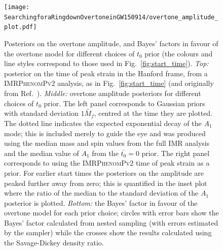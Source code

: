 \begin{figure}[t!]
    \centering
    \texttt{[image: SearchingforaRingdownOvertoneinGW150914/overtone\_amplitude\_plot.pdf]}
    \caption[Posteriors on the GW150914 overtone amplitude and Bayes' factors in favour of the overtone model for each choice of ringdown start-time prior]{ 
    Posteriors on the overtone amplitude, and Bayes' factors in favour of the overtone model for different choices of $t_0$ prior (the colours and line styles correspond to those used in Fig.~\ref{fig:start_time}).
    \emph{Top:} posterior on the time of peak strain in the Hanford frame, from a \textsc{IMRPhenomPv2} analysis, as in Fig.~\ref{fig:start_time} (and originally from Ref.~\cite{Isi:2022mhy}). 
    \emph{Middle:} overtone amplitude posteriors for different choices of $t_0$ prior. The left panel corresponds to Gaussian priors with standard deviation $1\tilde{M_f}$, centred at the time they are plotted.
    The dotted line indicates the expected exponential decay of the $A_1$ mode; this is included merely to guide the eye and was produced using the median mass and spin values from the full IMR analysis and the median value of $A_1$ from the $\bar{t_0} = 0$ prior.
    The right panel corresponds to using the \textsc{IMRPhenomPv2} time of peak strain as a prior.
    For earlier start times the posteriors on the amplitude are peaked further away from zero; this is quantified in the inset plot where the ratio of the median to the standard deviation of the $A_1$ posterior is plotted.
    \emph{Bottom:} the Bayes' factor in favour of the overtone model for each prior choice; circles with error bars show the Bayes' factor calculated from nested sampling (with errors estimated by the sampler) while the crosses show the results calculated using the Savage-Dickey density ratio.
    }
    \label{fig:overtone_amplitude}
\end{figure}

